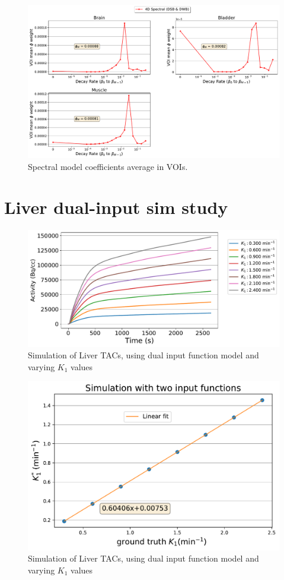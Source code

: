 \begin{figure} [h!]
\centering
\includegraphics[scale=0.48,angle=0]{3_Results/3_3_DWB_Reconstruction/figures/3_3_IsotoPK_CTRL_DWB_SpectralParams_peripheral_.pdf}
\caption{Spectral model coefficients average in VOIs.}
\label{fig_3_3:IsotoPK_CTRL_DSB_Spectrals}
\end{figure} 

\clearpage
\section{Liver dual-input sim study}

\begin{figure}[h!]
\centering
\includegraphics[scale=0.48,angle=0]{appendices/figures/ApendixC_multiple_K1.pdf}
\caption{Simulation of Liver TACs, using dual input function model and varying $K_1$ values}
\label{fig_3_3:K1_Sims}
\end{figure} 

\begin{figure}[h!]
\centering
\includegraphics[scale=0.48,angle=0]{appendices/figures/ApendixC_multiple_K1_solution.pdf}
\caption{Simulation of Liver TACs, using dual input function model and varying $K_1$ values}
\label{fig_3_3:K1_Sims_Results}
\end{figure} 